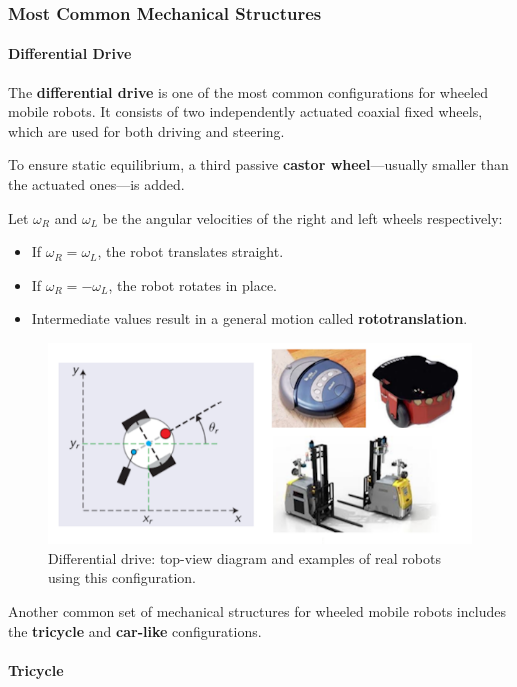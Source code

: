 \subsubsection*{Most Common Mechanical Structures}

\paragraph{Differential Drive} \hfill

The \textbf{differential drive} is one of the most common configurations for wheeled mobile robots. It consists of two independently actuated coaxial fixed wheels, which are used for both driving and steering.

To ensure static equilibrium, a third passive \textbf{castor wheel}—usually smaller than the actuated ones—is added.

Let $\omega_R$ and $\omega_L$ be the angular velocities of the right and left wheels respectively:
\begin{itemize}
  \item If $\omega_R = \omega_L$, the robot translates straight.
  \item If $\omega_R = -\omega_L$, the robot rotates in place.
  \item Intermediate values result in a general motion called \textbf{rototranslation}.
\end{itemize}

\begin{figure}[H]
  \centering
  \includegraphics[width=0.8\linewidth]{imgs/differential_drive.png}
  \caption{Differential drive: top-view diagram and examples of real robots using this configuration.}
\end{figure}

Another common set of mechanical structures for wheeled mobile robots includes the \textbf{tricycle} and \textbf{car-like} configurations.

\paragraph{Tricycle} \hfill

